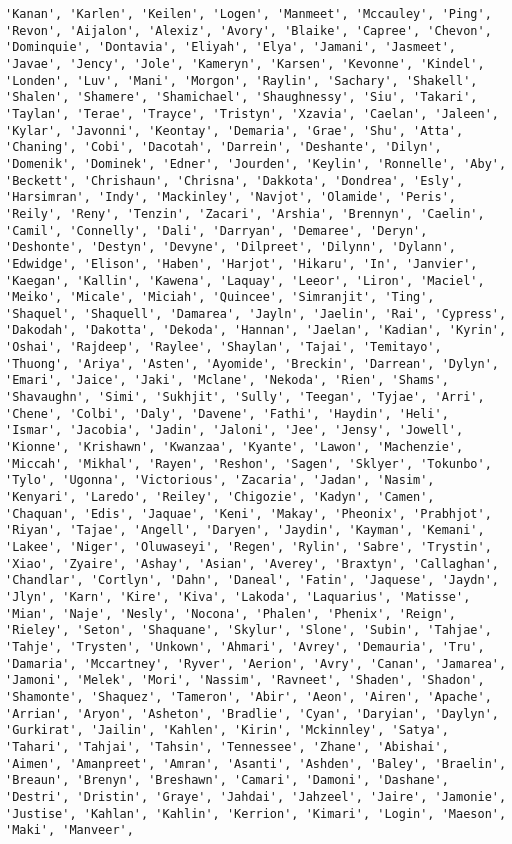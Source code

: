 \documentclass[11pt]{article}
\begin{document}
\begin{Verbatim}[commandchars=\\\{\}]
'Kanan', 'Karlen', 'Keilen', 'Logen', 'Manmeet', 'Mccauley', 'Ping', 'Revon', 'Aijalon', 'Alexiz', 'Avory', 'Blaike', 'Capree', 'Chevon', 'Dominquie', 'Dontavia', 'Eliyah', 'Elya', 'Jamani', 'Jasmeet', 'Javae', 'Jency', 'Jole', 'Kameryn', 'Karsen', 'Kevonne', 'Kindel', 'Londen', 'Luv', 'Mani', 'Morgon', 'Raylin', 'Sachary', 'Shakell', 'Shalen', 'Shamere', 'Shamichael', 'Shaughnessy', 'Siu', 'Takari', 'Taylan', 'Terae', 'Trayce', 'Tristyn', 'Xzavia', 'Caelan', 'Jaleen', 'Kylar', 'Javonni', 'Keontay', 'Demaria', 'Grae', 'Shu', 'Atta', 'Chaning', 'Cobi', 'Dacotah', 'Darrein', 'Deshante', 'Dilyn', 'Domenik', 'Dominek', 'Edner', 'Jourden', 'Keylin', 'Ronnelle', 'Aby', 'Beckett', 'Chrishaun', 'Chrisna', 'Dakkota', 'Dondrea', 'Esly', 'Harsimran', 'Indy', 'Mackinley', 'Navjot', 'Olamide', 'Peris', 'Reily', 'Reny', 'Tenzin', 'Zacari', 'Arshia', 'Brennyn', 'Caelin', 'Camil', 'Connelly', 'Dali', 'Darryan', 'Demaree', 'Deryn', 'Deshonte', 'Destyn', 'Devyne', 'Dilpreet', 'Dilynn', 'Dylann', 'Edwidge', 'Elison', 'Haben', 'Harjot', 'Hikaru', 'In', 'Janvier', 'Kaegan', 'Kallin', 'Kawena', 'Laquay', 'Leeor', 'Liron', 'Maciel', 'Meiko', 'Micale', 'Miciah', 'Quincee', 'Simranjit', 'Ting', 'Shaquel', 'Shaquell', 'Damarea', 'Jayln', 'Jaelin', 'Rai', 'Cypress', 'Dakodah', 'Dakotta', 'Dekoda', 'Hannan', 'Jaelan', 'Kadian', 'Kyrin', 'Oshai', 'Rajdeep', 'Raylee', 'Shaylan', 'Tajai', 'Temitayo', 'Thuong', 'Ariya', 'Asten', 'Ayomide', 'Breckin', 'Darrean', 'Dylyn', 'Emari', 'Jaice', 'Jaki', 'Mclane', 'Nekoda', 'Rien', 'Shams', 'Shavaughn', 'Simi', 'Sukhjit', 'Sully', 'Teegan', 'Tyjae', 'Arri', 'Chene', 'Colbi', 'Daly', 'Davene', 'Fathi', 'Haydin', 'Heli', 'Ismar', 'Jacobia', 'Jadin', 'Jaloni', 'Jee', 'Jensy', 'Jowell', 'Kionne', 'Krishawn', 'Kwanzaa', 'Kyante', 'Lawon', 'Machenzie', 'Miccah', 'Mikhal', 'Rayen', 'Reshon', 'Sagen', 'Sklyer', 'Tokunbo', 'Tylo', 'Ugonna', 'Victorious', 'Zacaria', 'Jadan', 'Nasim', 'Kenyari', 'Laredo', 'Reiley', 'Chigozie', 'Kadyn', 'Camen', 'Chaquan', 'Edis', 'Jaquae', 'Keni', 'Makay', 'Pheonix', 'Prabhjot', 'Riyan', 'Tajae', 'Angell', 'Daryen', 'Jaydin', 'Kayman', 'Kemani', 'Lakee', 'Niger', 'Oluwaseyi', 'Regen', 'Rylin', 'Sabre', 'Trystin', 'Xiao', 'Zyaire', 'Ashay', 'Asian', 'Averey', 'Braxtyn', 'Callaghan', 'Chandlar', 'Cortlyn', 'Dahn', 'Daneal', 'Fatin', 'Jaquese', 'Jaydn', 'Jlyn', 'Karn', 'Kire', 'Kiva', 'Lakoda', 'Laquarius', 'Matisse', 'Mian', 'Naje', 'Nesly', 'Nocona', 'Phalen', 'Phenix', 'Reign', 'Rieley', 'Seton', 'Shaquane', 'Skylur', 'Slone', 'Subin', 'Tahjae', 'Tahje', 'Trysten', 'Unkown', 'Ahmari', 'Avrey', 'Demauria', 'Tru', 'Damaria', 'Mccartney', 'Ryver', 'Aerion', 'Avry', 'Canan', 'Jamarea', 'Jamoni', 'Melek', 'Mori', 'Nassim', 'Ravneet', 'Shaden', 'Shadon', 'Shamonte', 'Shaquez', 'Tameron', 'Abir', 'Aeon', 'Airen', 'Apache', 'Arrian', 'Aryon', 'Asheton', 'Bradlie', 'Cyan', 'Daryian', 'Daylyn', 'Gurkirat', 'Jailin', 'Kahlen', 'Kirin', 'Mckinnley', 'Satya', 'Tahari', 'Tahjai', 'Tahsin', 'Tennessee', 'Zhane', 'Abishai', 'Aimen', 'Amanpreet', 'Amran', 'Asanti', 'Ashden', 'Baley', 'Braelin', 'Breaun', 'Brenyn', 'Breshawn', 'Camari', 'Damoni', 'Dashane', 'Destri', 'Dristin', 'Graye', 'Jahdai', 'Jahzeel', 'Jaire', 'Jamonie', 'Justise', 'Kahlan', 'Kahlin', 'Kerrion', 'Kimari', 'Login', 'Maeson', 'Maki', 'Manveer', 
\end{Verbatim}
\end{document}

